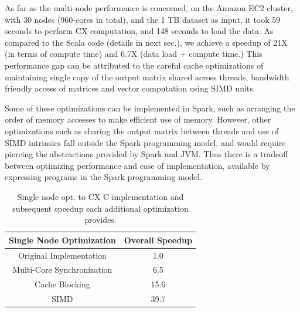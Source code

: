


        As far as the multi-node performance is concerned, 
 on the Amazon EC2 cluster, with 30 nodes (960-cores in total), and
 the 1 TB dataset as input, it
 took 59 seconds to perform CX computation, 
 and 148 seconds to load the data.
 As compared to the Scala code (details in
 next sec.), we achieve a speedup of 21X (in terms of
 compute time) and 6.7X (data load  + compute time.)
%
 This performance gap can be attributed to the careful cache
 optimizations of maintaining single copy of the output matrix shared
 across threads, bandwidth friendly access of matrices and vector
 computation using SIMD units.

 Some of these optimizations can be implemented in Spark, such as arranging the
 order of memory accesses to make efficient use of memory. %
 However, other optimizations such as sharing the output matrix between threads
 and use of SIMD intrinsics fall outside the Spark programming model, and would
 require piercing the abstractions provided by Spark and JVM.
 Thus there is a tradeoff between optimizing performance 
 and ease of implementation, %
 available by expressing programs in the Spark programming model.

 
  \begin{table}
  \begin{center}
  \begin{tabular}{ |c|c| } 
  \hline
  Single Node Optimization & Overall Speedup\\
  \hline
  Original Implementation & 1.0  \\
  Multi-Core Synchronization & 6.5 \\
  Cache Blocking & 15.6 \\
  SIMD & 39.7 \\
  \hline

  \end{tabular}
  \end{center}
  \caption{Single node opt. to CX C implementation and
  subsequent speedup  each additional optimization provides.}
  \label{tab:single_node}
  \end{table}
 



